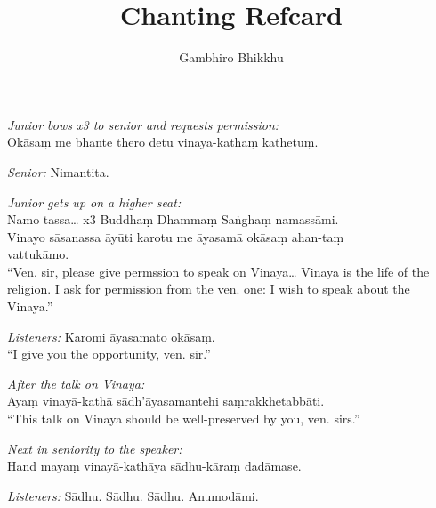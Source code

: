 \documentclass[10pt,oneside]{memoir}
\title{Chanting Refcard}
\author{Gambhiro Bhikkhu}
\begin{document}
\begin{hangparas}{1em}{1}

\emph{Junior bows x3 to senior and requests permission:}\\
Okāsaṃ me bhante thero detu vinaya-kathaṃ kathetuṃ.

\emph{Senior:} Nimantita.

\emph{Junior gets up on a higher seat:}\\
Namo tassa\ldots{} x3 Buddhaṃ Dhammaṃ Saṅghaṃ namassāmi.\\
Vinayo sāsanassa āyūti karotu me āyasamā okāsaṃ ahan-taṃ\\ vattukāmo.\\
``Ven. sir, please give permssion to speak on Vinaya\ldots{} Vinaya is the
life of the religion. I ask for permission from the ven. one: I wish
to speak about the Vinaya.''

\emph{Listeners:} Karomi āyasamato okāsaṃ.\\
``I give you the opportunity, ven. sir.''

\emph{After the talk on Vinaya:}\\
Ayaṃ vinayā-kathā sādh'āyasamantehi saṃrakkhetabbāti.\\
``This talk on Vinaya should be well-preserved by you, ven. sirs.''

\emph{Next in seniority to the speaker:}\\
Hand mayaṃ vinayā-kathāya sādhu-kāraṃ dadāmase.

\emph{Listeners:} Sādhu. Sādhu. Sādhu. Anumodāmi.

\end{hangparas}
\end{document}
